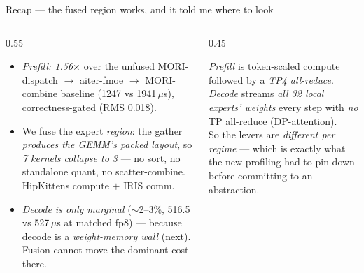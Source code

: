 \documentclass[pdf,aspectratio=169]{beamer}
\newcommand{\empy}[1]{{\color{darkorange}\emph{#1}}}
\newcommand{\empr}[1]{{\color{cardinalred}\emph{#1}}}
\newcommand{\examplebox}[2]{%
\begin{tcolorbox}[colframe=darkcardinal,colback=boxgray,title={#1}]
#2
\end{tcolorbox}}
\begin{document}
\begin{frame}{Recap --- the fused region works, and it told me where to look}
\footnotesize
\begin{columns}
\begin{column}{0.55\textwidth}
\begin{itemize}\footnotesize
  \item \empr{Prefill: 1.56$\times$} over the unfused MORI-dispatch $\to$ aiter-fmoe $\to$ MORI-combine baseline (1247 vs 1941\,$\mu$s), correctness-gated (RMS 0.018).
  \item We fuse the expert \emph{region}: the gather \empy{produces the GEMM's packed layout}, so \empy{7 kernels collapse to 3} --- no sort, no standalone quant, no scatter-combine. HipKittens compute $+$ IRIS comm.
  \item \empr{Decode is only marginal} ($\sim$2--3\%, 516.5 vs 527\,$\mu$s at matched fp8) --- because decode is a \empy{weight-memory wall} (next). Fusion cannot move the dominant cost there.
\end{itemize}
\end{column}
\begin{column}{0.45\textwidth}
\examplebox{Two regimes, two bottlenecks}{\footnotesize
\empy{Prefill} is token-scaled compute followed by a \empr{TP4 all-reduce}. \empy{Decode} streams \empr{all 32 local experts' weights} every step with \emph{no} TP all-reduce (DP-attention).
\vspace{1ex}\\
So the levers are \emph{different per regime} --- which is exactly what the new profiling had to pin down before committing to an abstraction.}
\end{column}
\end{columns}
\end{frame}
\end{document}
